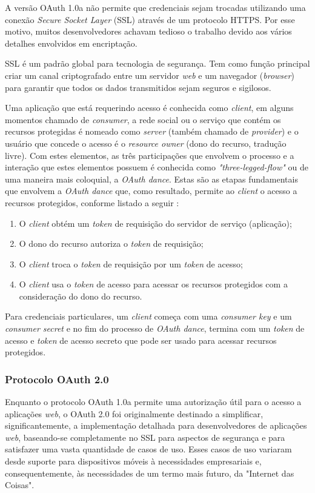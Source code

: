 A versão OAuth 1.0a não permite que credenciais sejam trocadas utilizando uma conexão \textit{Secure Socket Layer} (SSL) através de um protocolo HTTPS. Por esse motivo, muitos desenvolvedores achavam tedioso o trabalho devido aos vários detalhes envolvidos em encriptação.

SSL é um padrão global para tecnologia de segurança. Tem como função principal criar um canal criptografado entre um servidor \textit{web} e um navegador (\textit{browser}) para garantir que todos os dados transmitidos sejam seguros e sigilosos.

Uma aplicação que está requerindo acesso é conhecida como \textit{client}, em alguns momentos chamado de \textit{consumer}, a rede social ou o serviço que contém os recursos protegidas é nomeado como \textit{server} (também chamado de \textit{provider}) e o usuário que concede o acesso é o \textit{resource owner} (dono do recurso, tradução livre). Com estes elementos, as três participações que envolvem o processo e a interação que estes elementos possuem é conhecida como \textit{"three-legged-flow"} ou de uma maneira mais coloquial, a \textit{OAuth dance}. Estas são as etapas fundamentais que envolvem a \textit{OAuth dance} que, como resultado, permite ao \textit{client} o acesso a recursos protegidos, conforme listado a seguir \cite{mining-social-web}:

\begin{enumerate}
	\item O \textit{client} obtém um \textit{token} de requisição do servidor de serviço (aplicação);
	\item O dono do recurso autoriza o \textit{token} de requisição;
	\item O \textit{client} troca o \textit{token} de requisição por um \textit{token} de acesso;
	\item O \textit{client} usa o \textit{token} de acesso para acessar os recursos protegidos com a consideração do dono do recurso.
\end{enumerate}

Para credenciais particulares, um \textit{client} começa com uma \textit{consumer key} e um \textit{consumer secret} e no fim do processo de \textit{OAuth dance}, termina com um \textit{token} de acesso e \textit{token} de acesso secreto que pode ser usado para acessar recursos protegidos.

\subsubsection{Protocolo OAuth 2.0}
Enquanto o protocolo OAuth 1.0a permite uma autorização útil para o acesso a aplicações \textit{web}, o OAuth 2.0 foi originalmente destinado a simplificar, significantemente, a implementação detalhada para desenvolvedores de aplicações \textit{web}, baseando-se completamente no SSL para aspectos de segurança e para satisfazer uma vasta quantidade de casos de uso. Esses casos de uso variaram desde suporte para dispositivos móveis à necessidades empresariais e, consequentemente, às necessidades de um termo mais futuro, da "Internet das Coisas"\space \cite{mining-social-web}.

